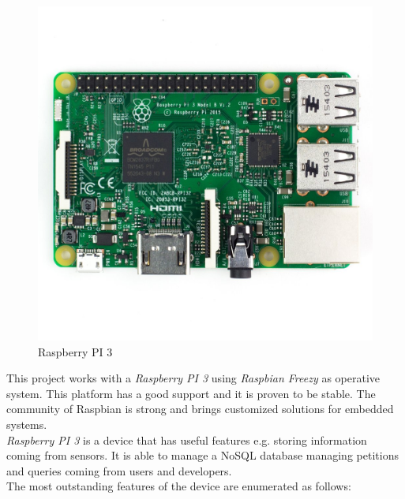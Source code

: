 \begin{figure}[H]
\begin{centering}
\includegraphics[scale=0.3]{IMGS/RPI_3.JPG}
\caption{Raspberry PI 3 \label{RPI_3}}
\end{centering}
\end{figure}

This project works with a \textit{Raspberry PI 3} using \textit{Raspbian Freezy} as operative system. This platform has a good support and it is proven to be stable. The community of Raspbian is strong and brings customized solutions for embedded systems.\\

\textit{Raspberry PI 3} is a device that has useful features e.g. storing information coming from sensors. It is able to manage a NoSQL database managing petitions and queries coming from users and developers.\\

The most outstanding features of the device are enumerated as follows:

